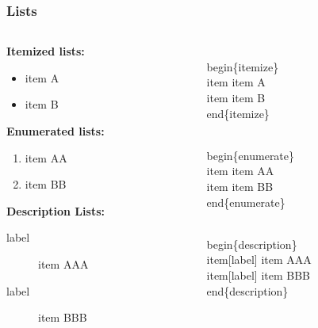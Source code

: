 \documentclass{beamer}
\begin{document}
\begin{frame}[fragile]
	\frametitle{Lists}
	\begin{columns}[T]
		\begin{column}{0.5\textwidth}
				\textbf{Itemized lists:}
			\begin{itemize}
				\item item A
				\item item B
			\end{itemize}	
			\textbf{Enumerated lists:}
			\begin{enumerate}
				\item item AA
				\item item BB
			\end{enumerate}
			\textbf{Description Lists:}
			\begin{description}
				\item[label] item AAA
				\item[label] item BBB
			\end{description}
		\end{column}
		\hspace{-50pt}
		\vrule
		\hspace{30pt}
		\begin{column}{0.5\textwidth}
			\begin{semiverbatim}
				\begin{tiny}
				\\begin\{itemize\}
					\-\ \\item item A
					\-\ \\item item B
				\\end\{itemize\}
				\medskip
				
				\\begin\{enumerate\}
					\-\ \\item item AA
					\-\ \\item item BB
				\\end\{enumerate\}
				\medskip

				\\begin\{description\}
					\-\ \\item[label] item AAA
					\-\ \\item[label] item BBB
				\\end\{description\}
				\end{tiny}
			\end{semiverbatim}
		\end{column}
	\end{columns}
\end{frame}
\end{document}
